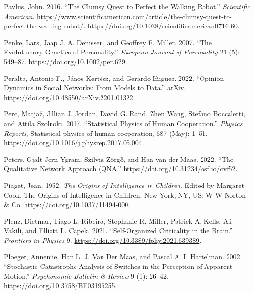 \documentclass[
  a4paper,
  DIV=11,
  numbers=noendperiod,
  oneside]{scrreprt}
\newlength{\cslhangindent}
\newlength{\cslentryspacingunit} %
\newenvironment{CSLReferences}[2] %
 {%
  \setlength{\parindent}{0pt}
  \ifodd #1
  \let\oldpar\par
  \def\par{\hangindent=\cslhangindent\oldpar}
  \fi
  \setlength{\parskip}{#2\cslentryspacingunit}
 }%
 {}
\begin{document}
\begin{CSLReferences}{1}{0}
\leavevmode{}%
Pavlus, John. 2016. {``The {Clumsy Quest} to {Perfect} the {Walking
Robot}.''} \emph{Scientific American}.
https://www.scientificamerican.com/article/the-clumsy-quest-to-perfect-the-walking-robot/.
\url{https://doi.org/10.1038/scientificamerican0716-60}.

\leavevmode{}%
Penke, Lars, Jaap J. A. Denissen, and Geoffrey F. Miller. 2007. {``The
Evolutionary Genetics of Personality.''} \emph{European Journal of
Personality} 21 (5): 549--87. \url{https://doi.org/10.1002/per.629}.

\leavevmode{}%
Peralta, Antonio F., János Kertész, and Gerardo Iñiguez. 2022.
{``Opinion Dynamics in Social Networks: {From} Models to Data.''}
{arXiv}. \url{https://doi.org/10.48550/arXiv.2201.01322}.

\leavevmode{}%
Perc, Matjaž, Jillian J. Jordan, David G. Rand, Zhen Wang, Stefano
Boccaletti, and Attila Szolnoki. 2017. {``Statistical Physics of Human
Cooperation.''} \emph{Physics Reports}, Statistical physics of human
cooperation, 687 (May): 1--51.
\url{https://doi.org/10.1016/j.physrep.2017.05.004}.

\leavevmode{}%
Peters, Gjalt Jorn Ygram, Szilvia Zörgő, and Han van der Maas. 2022.
{``The {Qualitative Network Approach} ({QNA}.''}
\url{https://doi.org/10.31234/osf.io/cvf52}.

\leavevmode{}%
Piaget, Jean. 1952. \emph{The Origins of Intelligence in Children}.
Edited by Margaret Cook. The Origins of Intelligence in Children. {New
York, NY, US}: {W W Norton \& Co}.
\url{https://doi.org/10.1037/11494-000}.

\leavevmode{}%
Plenz, Dietmar, Tiago L. Ribeiro, Stephanie R. Miller, Patrick A. Kells,
Ali Vakili, and Elliott L. Capek. 2021. {``Self-{Organized Criticality}
in the {Brain}.''} \emph{Frontiers in Physics} 9.
\url{https://doi.org/10.3389/fphy.2021.639389}.

\leavevmode{}%
Ploeger, Annemie, Han L. J. Van Der Maas, and Pascal A. I. Hartelman.
2002. {``Stochastic Catastrophe Analysis of Switches in the Perception
of Apparent Motion.''} \emph{Psychonomic Bulletin \& Review} 9 (1):
26--42. \url{https://doi.org/10.3758/BF03196255}.


\end{CSLReferences}
\end{document}
